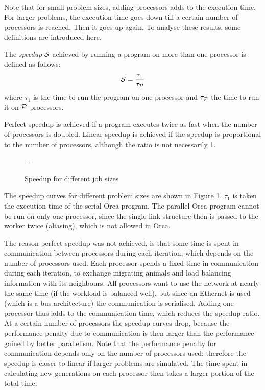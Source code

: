 Note that for small problem sizes, adding processors adds to the
execution time. For larger problems, the execution time goes down till
a certain number of processors is reached. Then it goes up again.
To analyse these results, some definitions are introduced
here.

The {\em speedup} ${\cal S}$ achieved by running a program on more than one
processor is defined as follows:
\[
        {\cal S} = \frac{\tau_1}{\tau_{\cal P}}
\]
where $\tau_1$ is the time to run the program on one processor and
$\tau_{\cal P}$ the time to run it on ${\cal P}$ processors.

Perfect speedup is achieved if a program executes twice as fast when the
number of processors is doubled. Linear speedup is achieved if the
speedup is 
proportional to the number of processors, although the ratio is not
necessarily 1.

\begin{figure}[p]
\epsfxsize=\textwidth
{}
\caption{Speedup for different job sizes}
\label{fSpeedup}
\end{figure}

The speedup curves for different problem sizes are shown in Figure
\ref{fSpeedup}. $\tau_1$ is taken the execution time of the serial Orca program.
The parallel Orca program cannot be run on only one processor, since the
single link structure then is passed to the worker twice (aliasing),
which is not allowed in Orca.

The reason perfect speedup was not achieved, is that
some time is spent in communication between processors during each
iteration, which depends on the number of processors used.  Each
processor spends a fixed time in communication during each iteration, to
exchange migrating animals and load balancing information with its
neighbours. All processors want to use the network at nearly the same time
(if the workload is balanced well), but since an Ethernet is used
(which is a bus architecture) the communication is serialised. Adding
one processor thus adds to the communication time, which
reduces the speedup ratio. At a certain number of processors the
speedup curves drop, because the performance penalty due to
communication is then larger than the performance gained by better
parallelism. Note that the performance penalty for
communication depends only on the number of processors used: therefore
the speedup is closer to linear if larger problems are simulated.
The time spent
in calculating new generations on each processor then takes a larger
portion of the total time.

